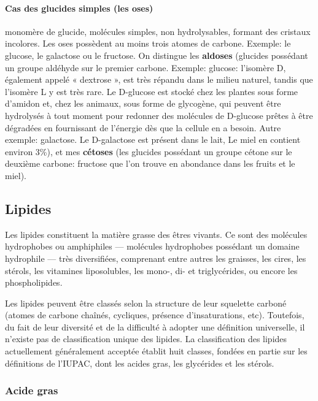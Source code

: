 \documentclass[11pt]{report}
\numberwithin{figure}{section}
\numberwithin{equation}{section}
\numberwithin{table}{section}
\newcommand{\1}{\boldsymbol{1}}
\begin{document}
\paragraph{Cas des glucides simples (les oses)}  monomère de glucide, molécules simples, non hydrolysables, formant des cristaux incolores. Les oses possèdent au moins trois atomes de carbone. Exemple: le glucose, le galactose ou le fructose. On distingue les \textbf{aldoses} (glucides possédant un groupe aldéhyde sur le premier carbone. Exemple: glucose: l'isomère D, également appelé « dextrose », est très répandu dans le milieu naturel, tandis que l'isomère L y est très rare. Le D-glucose est stocké chez les plantes sous forme d'amidon et, chez les animaux, sous forme de glycogène, qui peuvent être hydrolysés à tout moment pour redonner des molécules de D-glucose prêtes à être dégradées en fournissant de l'énergie dès que la cellule en a besoin. Autre exemple: galactose. Le D-galactose est présent dans le lait, Le miel en contient environ 3\%), et mes \textbf{cétoses} (les glucides possédant un groupe cétone sur le deuxième carbone: fructose que l'on trouve en abondance dans les fruits et le miel).


\subsection{Lipides}

Les lipides constituent la matière grasse des êtres vivants. Ce sont des molécules hydrophobes ou amphiphiles — molécules hydrophobes possédant un domaine hydrophile — très diversifiées, comprenant entre autres les graisses, les cires, les stérols, les vitamines liposolubles, les mono-, di- et triglycérides, ou encore les phospholipides.

Les lipides peuvent être classés selon la structure de leur squelette carboné (atomes de carbone chaînés, cycliques, présence d'insaturations, etc). Toutefois, du fait de leur diversité et de la difficulté à adopter une définition universelle, il n'existe pas de classification unique des lipides. La classification des lipides actuellement généralement acceptée établit huit classes, fondées en partie sur les définitions de l'IUPAC, dont les acides gras, les glycérides et les stérols.

\subsubsection{Acide gras}
\end{document}
